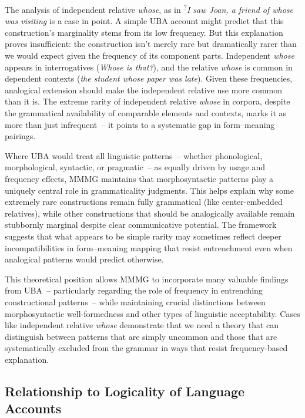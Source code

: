 \documentclass[12pt,letterpaper]{article}
\begin{document}
The analysis of independent relative \textit{whose}, as in \textsuperscript{?}\textit{I saw Joan, a friend of whose was visiting} is a case in point. A simple UBA account might predict that this construction's marginality stems from its low frequency. But this explanation proves insufficient: the construction isn't merely rare but dramatically rarer than we would expect given the frequency of its component parts. Independent \textit{whose} appears in interrogatives (\textit{Whose is that?}), and the relative \textit{whose} is common in dependent contexts (\textit{the student whose paper was late}). Given these frequencies, analogical extension should make the independent relative use more common than it is. The extreme rarity of independent relative \textit{whose} in corpora, despite the grammatical availability of comparable elements and contexts, marks it as more than just infrequent~-- it points to a systematic gap in form--meaning pairings.

Where UBA would treat all linguistic patterns~-- whether phonological, morphological, syntactic, or pragmatic~-- as equally driven by usage and frequency effects, MMMG maintains that morphosyntactic patterns play a uniquely central role in grammaticality judgments. This helps explain why some extremely rare constructions remain fully grammatical (like center-embedded relatives), while other constructions that should be analogically available remain stubbornly marginal despite clear communicative potential. The framework suggests that what appears to be simple rarity may sometimes reflect deeper incompatibilities in form--meaning mapping that resist entrenchment even when analogical patterns would predict otherwise.

This theoretical position allows MMMG to incorporate many valuable findings from UBA~-- particularly regarding the role of frequency in entrenching constructional patterns~-- while maintaining crucial distinctions between morphosyntactic well-formedness and other types of linguistic acceptability. Cases like independent relative \textit{whose} demonstrate that we need a theory that can distinguish between patterns that are simply uncommon and those that are systematically excluded from the grammar in ways that resist frequency-based explanation.

\subsection{Relationship to Logicality of Language Accounts}
\end{document}
